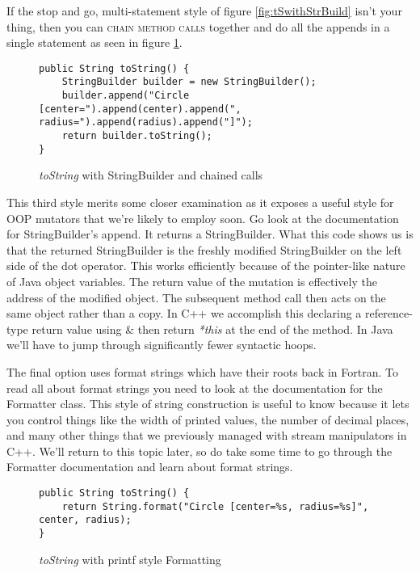 \documentclass[]{tufte-handout}
\begin{document}
If the stop and go, multi-statement style of figure \ref{fig:tSwithStrBuild} isn't your thing, then you can \textsc{chain method calls} together and do all the appends in a single statement as seen in figure \ref{fig:tSwithStrBuild2}. 
\begin{figure}[!ht]
\begin{lstlisting}
public String toString() {
	StringBuilder builder = new StringBuilder();
	builder.append("Circle [center=").append(center).append(", radius=").append(radius).append("]");
	return builder.toString();
}
\end{lstlisting}
\label{fig:tSwithStrBuild2}
\caption{\textit{toString} with StringBuilder and chained calls}
\end{figure}
This third style merits some closer examination as it exposes a useful style for OOP mutators that we're likely to employ soon. Go look at the documentation for StringBuilder's append. It returns a StringBuilder. What this code shows us is that the returned StringBuilder is the freshly modified StringBuilder on the left side of the dot operator. This works efficiently because of the pointer-like nature of Java object variables. The return value of the mutation is effectively the address of the modified object. The subsequent method call then acts on the same object rather than a copy. In C++ we accomplish this declaring a reference-type return value using \& then return \textit{*this} at the end of the method. In Java we'll have to jump through significantly fewer syntactic hoops. 

The final option uses format strings which have their roots back in Fortran. To read all about format strings you need to look at the documentation for the Formatter class. This style of string construction is useful to know because it lets you control things like the width of printed values, the number of decimal places, and many other things that we previously managed with stream manipulators in C++. We'll return to this topic later, so do take some time to go through the Formatter documentation and learn about format strings. 	
\begin{figure}[!ht]
\begin{lstlisting}
public String toString() {
	return String.format("Circle [center=%s, radius=%s]", center, radius);
}
\end{lstlisting}
\label{fig:tSwithFormat}
\caption{\textit{toString} with printf style Formatting}
\end{figure}
\end{document}
